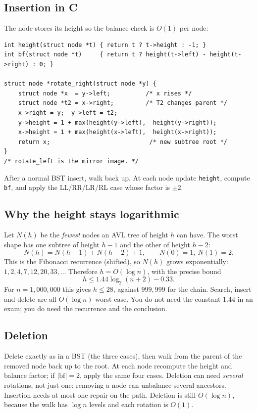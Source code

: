 \documentclass[11pt]{article}
\theoremstyle{definition}
\begin{document}
\subsection{Insertion in C}

The node stores its height so the balance check is $O(1)$ per node:

\begin{verbatim}
int height(struct node *t) { return t ? t->height : -1; }
int bf(struct node *t)     { return t ? height(t->left) - height(t->right) : 0; }

struct node *rotate_right(struct node *y) {
    struct node *x  = y->left;          /* x rises */
    struct node *t2 = x->right;         /* T2 changes parent */
    x->right = y;  y->left = t2;
    y->height = 1 + max(height(y->left),  height(y->right));
    x->height = 1 + max(height(x->left),  height(x->right));
    return x;                            /* new subtree root */
}
/* rotate_left is the mirror image. */
\end{verbatim}

After a normal BST insert, walk back up. At each node update \texttt{height},
compute \texttt{bf}, and apply the LL/RR/LR/RL case whose factor is $\pm2$.

\subsection{Why the height stays logarithmic}

Let $N(h)$ be the \emph{fewest} nodes an AVL tree of height $h$ can have. The
worst shape has one subtree of height $h-1$ and the other of height $h-2$:
\[
  N(h) = N(h-1) + N(h-2) + 1,\qquad N(0)=1,\ N(1)=2.
\]
This is the Fibonacci recurrence (shifted), so $N(h)$ grows exponentially:
$1,2,4,7,12,20,33,\dots$ Therefore $h=O(\log n)$, with the precise bound
\[
  h \le 1.44\log_2(n+2) - 0.33.
\]
For $n=1{,}000{,}000$ this gives $h\le 28$, against $999{,}999$ for the chain.
Search, insert and delete are all $O(\log n)$ worst case. You do not need the
constant $1.44$ in an exam; you do need the recurrence and the conclusion.

\subsection{Deletion}

Delete exactly as in a BST (the three cases), then walk from the parent of the
removed node back up to the root. At each node recompute the height and
balance factor; if $|\mathrm{bf}|=2$, apply the same four cases. Deletion can
need \emph{several} rotations, not just one: removing a node can unbalance
several ancestors. Insertion needs at most one repair on the path. Deletion is
still $O(\log n)$, because the walk has $\log n$ levels and each rotation is
$O(1)$.
\end{document}
